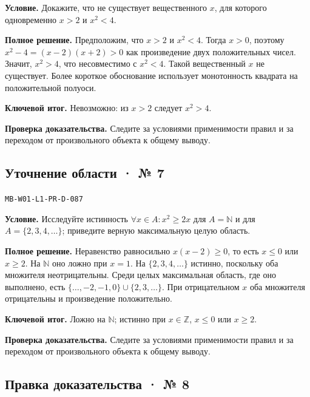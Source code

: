 \documentclass[11pt,a4paper,openany]{book}
\newcommand{\muid}[1]{\texttt{\footnotesize #1}}
\begin{document}
\textbf{Условие.} Докажите, что не существует вещественного $x$, для которого одновременно $x>2$ и $x^2<4$.\par

\textbf{Полное решение.} Предположим, что $x>2$ и $x^2<4$. Тогда $x>0$, поэтому $x^2-4=(x-2)(x+2)>0$ как произведение двух положительных чисел. Значит, $x^2>4$, что несовместимо с $x^2<4$. Такой вещественный $x$ не существует. Более короткое обоснование использует монотонность квадрата на положительной полуоси.


\begin{learnbox}\textbf{Ключевой итог.} Невозможно: из $x>2$ следует $x^2>4$.\par \textbf{Проверка доказательства.} 
Следите за условиями применимости правил и за переходом от произвольного объекта к общему выводу. 
\end{learnbox}

\subsection*{Уточнение области · № 7}\hypertarget{solution:MB-W01-L1-PR-D-087}{}

\muid{MB-W01-L1-PR-D-087}\par

\textbf{Условие.} Исследуйте истинность $\forall x\in A\colon x^2\ge2x$ для $A=\mathbb N$ и для $A=\{2,3,4,\ldots\}$; приведите верную максимальную целую область.\par

\textbf{Полное решение.} Неравенство равносильно $x(x-2)\ge0$, то есть $x\le0$ или $x\ge2$. На $\mathbb N$ оно ложно при $x=1$. На $\{2,3,4,\ldots\}$ истинно, поскольку оба множителя неотрицательны. Среди целых максимальная область, где оно выполнено, есть $\{\ldots,-2,-1,0\}\cup\{2,3,\ldots\}$. При отрицательном $x$ оба множителя отрицательны и произведение положительно.


\begin{learnbox}\textbf{Ключевой итог.} Ложно на $\mathbb N$; истинно при $x\in\mathbb Z$, $x\le0$ или $x\ge2$.\par \textbf{Проверка доказательства.} 
Следите за условиями применимости правил и за переходом от произвольного объекта к общему выводу. 
\end{learnbox}

\subsection*{Правка доказательства · № 8}\hypertarget{solution:MB-W01-L1-PR-D-088}{}
\end{document}
